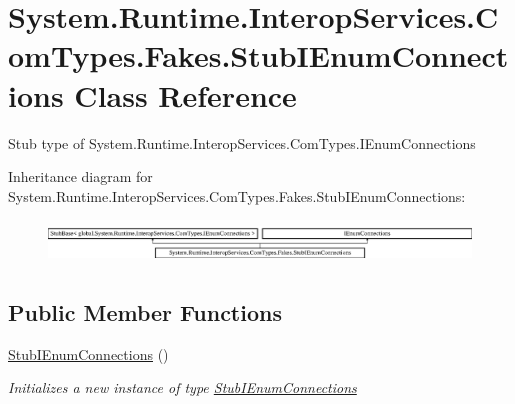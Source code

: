 \hypertarget{class_system_1_1_runtime_1_1_interop_services_1_1_com_types_1_1_fakes_1_1_stub_i_enum_connections}{\section{System.\-Runtime.\-Interop\-Services.\-Com\-Types.\-Fakes.\-Stub\-I\-Enum\-Connections Class Reference}
\label{class_system_1_1_runtime_1_1_interop_services_1_1_com_types_1_1_fakes_1_1_stub_i_enum_connections}
}


Stub type of System.\-Runtime.\-Interop\-Services.\-Com\-Types.\-I\-Enum\-Connections 


Inheritance diagram for System.\-Runtime.\-Interop\-Services.\-Com\-Types.\-Fakes.\-Stub\-I\-Enum\-Connections\-:\begin{figure}[H]
\begin{center}
\leavevmode
\includegraphics[height=1.149897cm]{class_system_1_1_runtime_1_1_interop_services_1_1_com_types_1_1_fakes_1_1_stub_i_enum_connections}
\end{center}
\end{figure}
\subsection*{Public Member Functions}
\begin{DoxyCompactItemize}
\item 
\hyperlink{class_system_1_1_runtime_1_1_interop_services_1_1_com_types_1_1_fakes_1_1_stub_i_enum_connections_ab362b76fee468b6553a0e77c4de23a79}{Stub\-I\-Enum\-Connections} ()
\begin{DoxyCompactList}\small\item\em Initializes a new instance of type \hyperlink{class_system_1_1_runtime_1_1_interop_services_1_1_com_types_1_1_fakes_1_1_stub_i_enum_connections}{Stub\-I\-Enum\-Connections}\end{DoxyCompactList}\end{DoxyCompactItemize}
